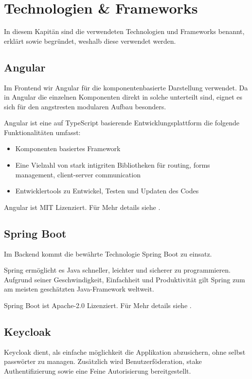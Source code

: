 \chapter{Technologien & Frameworks}

In diesem Kapitän sind die verwendeten Technologien und Frameworks benannt, erklärt
sowie begründet, weshalb diese verwendet werden.

\section{Angular}

Im Frontend wir Angular für die komponentenbasierte Darstellung verwendet.
Da in Angular die einzelnen Komponenten direkt in solche unterteilt sind,
eignet es sich für den angstresten modularen Aufbau besonders.

Angular ist eine auf \gls{TypeScript} basierende Entwicklungsplattform die folgende Funktionalitäten umfasst:
\begin{itemize}
    \item Komponenten basiertes Framework
    \item Eine Vielzahl von stark intigriten Bibliotheken für routing, forms management, client-server communication
    \item Entwicklertools zu Entwickel, Testen und Updaten des Codes
\end{itemize}
\cite{about-angular}

Angular ist MIT Lizenziert.
Für Mehr details siehe .

\section{Spring Boot}

Im Backend kommt die bewährte Technologie Spring Boot zu einsatz.

Spring ermöglicht es Java schneller, leichter und sicherer zu programmieren.
Aufgrund seiner Geschwindigkeit, Einfachheit und Produktivität gilt Spring zum am meisten geschätzten Java-Framework weltweit.
\cite{about-springboot}

Spring Boot ist Apache-2.0 Lizenziert.
Für Mehr details siehe .

\section{Keycloak}

Keycloak dient, als einfache möglichkeit die Applikation abzusichern, ohne selbst passwörter zu managen.
Zusätzlich wird Benutzerföderation, stake Authentifizierung sowie eine Feine Autorisierung bereitgestellt.
\cite{about-keycloak}

